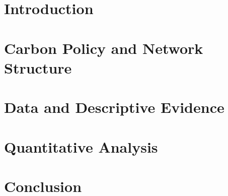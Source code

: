 \documentclass[11pt, reqno]{amsart}
\theoremstyle{definition}
\begin{document}
\maketitle

\pagebreak

\section{Introduction}\label{sec:introduction}



\section{Carbon Policy and Network Structure}\label{sec:model}



\section{Data and Descriptive Evidence}\label{sec:data}



\section{Quantitative Analysis}\label{sec:quantitative}



\section{Conclusion}\label{sec:conclusion}



\newpage



\newpage
\appendix


\end{document}
